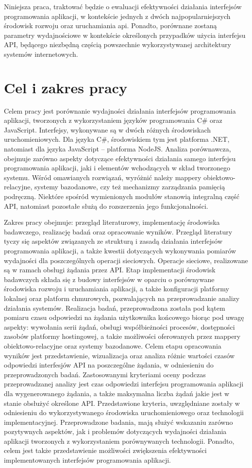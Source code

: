 Niniejsza praca, traktować będzie o ewaluacji efektywności działania interfejsów programowania aplikacji, w kontekście jednych z dwóch najpopularniejszych środowisk rozwoju oraz uruchamiania api. Ponadto, porównane zostaną parametry wydajnościowe w kontekście określonych przypadków użycia interfejsu API, będącego niezbędną częścią powszechnie wykorzystywanej architektury systemów internetowych.
\section{Cel i zakres pracy}
Celem pracy jest porównanie wydajności działania interfejsów programowania aplikacji, tworzonych z wykorzystaniem języków programowania C\# oraz JavaScript. Interfejsy, wykonywane są w dwóch różnych środowiskach uruchomieniowych. Dla języka C\#, środowiskiem tym jest platforma .NET, natomiast dla języka JavaScript – platforma NodeJS. Analiza porównawcza, obejmuje zarówno aspekty dotyczące efektywności działania samego interfejsu programowania aplikacji, jaki i elementów wchodzących w skład tworzonego systemu. Wśród omawianych rozwiązań, wyróżnić należy mappery obiektowo-relacyjne, systemy bazodanowe, czy też mechanizmy zarządzania pamięcią podręczną. Niektóre spośród wymienionych modułów stanowią integralną część API, natomiast pozostałe służą do rozszerzenia jego funkcjonalności.

Zakres pracy obejmuje: przegląd literaturowy, implementację środowiska badawczego, realizację badań oraz opracowanie wyników. Przegląd literatury tyczy się aspektów związanych ze strukturą i zasadą działania interfejsów programowania aplikacji, a także kwestii dotyczących wykonywania pomiarów wydajności dla poszczególnych operacji sieciowych. Operacje sieciowe, realizowane są w ramach obsługi żądania przez API. Etap implementacji środowisk badawczych składa się z budowy interfejsów w oparciu o porównywane środowiska rozwoju i uruchamiania aplikacji, a także konfiguracji platformy lokalnej oraz platform chmurowych, pozwalających na przeprowadzanie analizy działania systemów. Realizacja badań, przeprowadzona została pod kątem pomiaru czasu odpowiedzi na żądania użytkownika końcowego biorąc pod uwagę aspekty: wywołania serii żądań, obsługi współbieżności procesów, dostępności zasobów platformy hostingowej, a także możliwości oferowanych przez mappery obiektowo-relacyjne oraz systemy bazodanowe. Celem etapu opracowania wyników jest przedstawienie, wizualizacja oraz analiza różnic wartości czasów odpowiedzi interfesjów API na poszczególne żądania, w odniesieniu do przeprowadzonych badań. Zastosowanymi kryteriami oceny podczas przeprowadzanej analizy jest czas odpowiedzi interfejsu programowania aplikacji dla wygenerowanego żądania, a także maksymalna liczba żądań jakie jest w stanie obsłużyć określone API. Przedstawione kryteria, uwzględniane zostały w odniesieniu do wykorzystywanego środowiska uruchomieniowego oraz technologii implementacyjnej. Przeprowadzone badania, mają służyć wskazaniu zarówno pozytywnych aspektów, jak i problemów dotyczących wydajności działania aplikacji tworzonych z wykorzystaniem porównywanych technologii. Ponadto, celem jest także przedstawienie możliwości zwiększenia efektywności implementowanych interfejsów programowania aplikacji.
